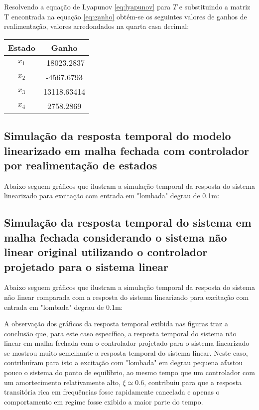    Resolvendo a equação de Lyapunov \ref{eq:lyapunov} para $T$ e substituindo a matriz T encontrada na equação \ref{eq:ganho} obtém-se os seguintes valores de ganhos de realimentação, valores arredondados na quarta casa decimal:
    
    \begin{center}
    \begin{tabular}{|c|c|}
        \hline
        Estado & Ganho\\
        \hline
        \hline
        $x_1$    & -18023.2837\\
        $x_2$    & -4567.6793\\
        $x_3$    & 13118.63414\\   
        $x_4$    & 2758.2869 \\
        \hline
    \end{tabular}
    \end{center}
    
\subsection{Simulação da resposta temporal do modelo linearizado em malha fechada com controlador por realimentação de estados} \label{sc:analise_resposta}
    
Abaixo seguem gráficos que ilustram a simulação temporal da resposta do sistema linearizado para excitação com entrada em "lombada" degrau de 0.1m:
  
\subsection{Simulação da resposta temporal do sistema em malha fechada considerando o sistema não linear original utilizando o controlador projetado para o sistema linear}
    
Abaixo seguem gráficos que ilustram a simulação temporal da resposta do sistema não linear comparada com a resposta do sistema linearizado para excitação com entrada em "lombada" degrau de 0.1m:

A observação dos gráficos da resposta temporal exibida nas figuras  traz a conclusão que, para este caso específico, a resposta temporal do sistema não linear em malha fechada com o controlador projetado para o sistema linearizado se mostrou muito semelhante a resposta temporal do sistema linear. Neste caso, contribuíram para isto a excitação com "lombada" em degrau pequena afastou pouco o sistema do ponto de equilíbrio, ao mesmo tempo que um controlador com um amortecimento relativamente alto, $\xi \simeq 0.6$, contribuiu para que a resposta transitória rica em frequências fosse rapidamente cancelada e apenas o comportamento em regime fosse exibido a maior parte do tempo.
    
